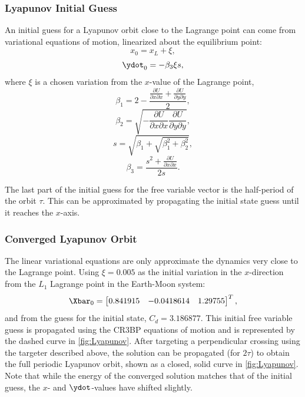 \subsubsection{Lyapunov Initial Guess}
An initial guess for a Lyapunov orbit close to the Lagrange point can come from variational
equations of motion, linearized about the equilibrium point:
\begin{equation}
    x_{0}=x_{L}+\xi,
    \label{eq:xvar}
\end{equation}
\begin{equation}
    \ydot_{0}=-\beta_{3}\xi s,
    \label{eq:ydotvar}
\end{equation}
where $\xi$ is a chosen variation from the $x$-value of the Lagrange point,
\begin{equation}
    \beta_{1}=2-\frac{\frac{\partial U}{\partial x\partial x}+\frac{\partial U}{\partial y\partial y}}{2},
    \label{eq:beta1}
\end{equation}
\begin{equation}
    \beta_{2}=\sqrt{-\frac{\partial U}{\partial x\partial x}\frac{\partial U}{\partial y\partial y}},
    \label{eq:beta2}
\end{equation}
\begin{equation}
    s=\sqrt{\beta_{1}+\sqrt{\beta_{1}^{2}+\beta_{2}^{2}}},
    \label{eq:s}
\end{equation}
\begin{equation}
    \beta_{3}=\frac{s^{2}+\frac{\partial U}{\partial x\partial x}}{2s}.
    \label{eq:beta3}
\end{equation}

The last part of the initial guess for the free variable vector is the half-period of the orbit
$\tau$. This can be approximated by propagating the initial state guess until it reaches the
$x$-axis.

\subsubsection{Converged Lyapunov Orbit}
The linear variational equations are only approximate the dynamics very close to the Lagrange
point. Using $\xi=0.005$ as the initial variation in the $x$-direction from the $L_{1}$ Lagrange
point in the Earth-Moon system:
\begin{equation}
    \Xbar_{0}=\begin{bmatrix}   0.841915    &   -0.0418614  &   1.29755\end{bmatrix}^{T},
    \label{eq:Lyapunovguess}
\end{equation}
and from the guess for the initial state, $C_{d}=3.186877$. This initial free variable guess is
propagated using the CR3BP equations of motion and is represented by the dashed curve in
\cref{fig:Lyapunov}. After targeting a perpendicular crossing using the targeter described above,
the solution can be propagated (for $2\tau$) to obtain the full periodic Lyapunov orbit, shown as
a closed, solid curve in \cref{fig:Lyapunov}. Note that while the energy of the converged solution
matches that of the initial guess, the $x$- and $\ydot$-values have shifted slightly.

